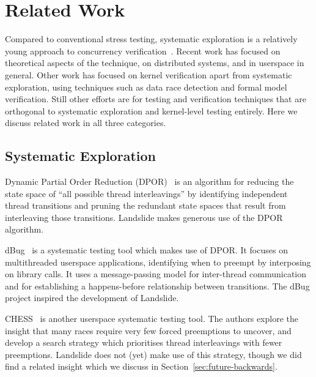 \chapter{Related Work}

Compared to conventional stress testing, systematic exploration is a relatively young approach to concurrency verification~\cite{verisoft}.
Recent work has focused on theoretical aspects of the technique, on distributed systems, and in userspace in general.
Other work has focused on kernel verification apart from systematic exploration, using techniques such as data race detection and formal model verification.
Still other efforts are for testing and verification techniques that are orthogonal to systematic exploration and kernel-level testing entirely.
Here we discuss related work in all three categories.


\section{Systematic Exploration}

Dynamic Partial Order Reduction (DPOR)\hspace{0in}~\cite{dpor,distributed-dpor,sdpor,dbug-retreat} is an algorithm for reducing the state space of ``all possible thread interleavings'' by identifying independent thread transitions and pruning the redundant state spaces that result from interleaving those transitions. Landslide makes generous use of the DPOR algorithm.

dBug~\cite{dbug-ssv} is a systematic testing tool which makes use of DPOR. It focuses on multithreaded userspace applications, identifying when to preempt by interposing on  library calls. It uses a message-passing model for inter-thread communication and for establishing a happens-before relationship between transitions. The dBug project inspired the development of Landslide.

CHESS~\cite{chess} is another userspace systematic testing tool. The authors explore the insight that many races require very few forced preemptions to uncover, and develop a search strategy which prioritises thread interleavings with fewer preemptions. Landslide does not (yet) make use of this strategy, though we did find a related insight which we discuss in Section~\ref{sec:future-backwards}.

